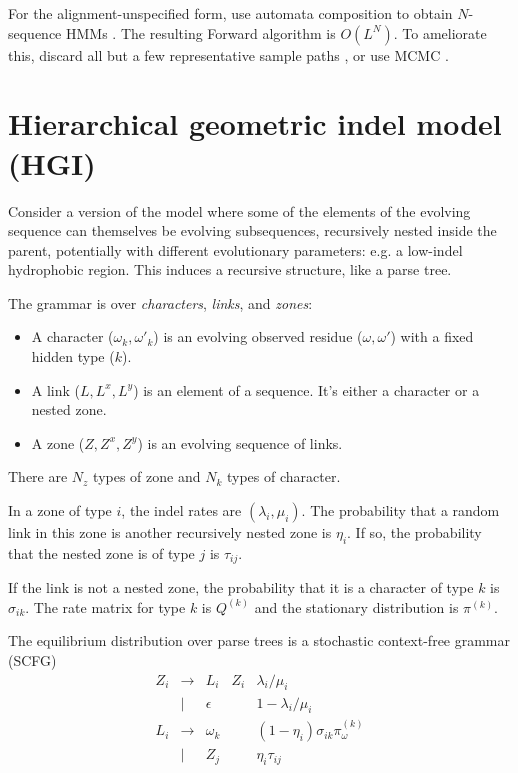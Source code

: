 \documentclass{article}
\begin{document}
For the alignment-unspecified form, use automata composition to obtain $N$-sequence HMMs \cite{SilvestreRyanEtAl2020}.
The resulting Forward algorithm is $O(L^N)$.
To ameliorate this, discard all but a few representative sample paths \cite{WestessonEtAl2012},
or use MCMC \cite{RedelingsSuchard2007}.


\section{Hierarchical geometric indel model (HGI)}

Consider a version of the model where some of the elements of the evolving sequence can themselves be evolving subsequences, recursively nested inside the parent,
potentially with different evolutionary parameters: e.g. a low-indel hydrophobic region.
This induces a recursive structure, like a parse tree.

The grammar is over {\em characters}, {\em links}, and {\em zones}:
\begin{itemize}
\item A character ($\omega_k, \omega'_k$) is an evolving observed residue ($\omega, \omega'$) with a fixed hidden type ($k$).
\item A link ($L,L^x,L^y$) is an element of a sequence. It's either a character or a nested zone.
\item A zone ($Z,Z^x,Z^y$) is an evolving sequence of links.
\end{itemize}

There are $N_z$ types of zone and $N_k$ types of character.

In a zone of type $i$, the indel rates are $(\lambda_i,\mu_i)$.
The probability that a random link in this zone is another recursively nested zone is $\eta_i$.
If so, the probability that the nested zone is of type $j$ is $\tau_{ij}$.

If the link is not a nested zone, the probability that it is a character of type $k$ is $\sigma_{ik}$.
The rate matrix for type $k$ is $Q^{(k)}$ and the stationary distribution is $\pi^{(k)}$.

The equilibrium distribution over parse trees is a stochastic context-free grammar (SCFG)
\[
\begin{array}{rclll}
  Z_i & \to & L_i & Z_i & \lambda_i/\mu_i \\
        & | & \epsilon & & 1 - \lambda_i/\mu_i \\
  L_i & \to & \omega_k & & (1-\eta_i) \sigma_{ik} \pi^{(k)}_{\omega} \\
      & | & Z_j & & \eta_i \tau_{ij}
\end{array}
\]
\end{document}
